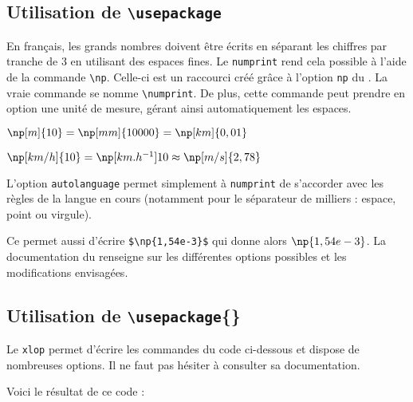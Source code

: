 \subsection{Utilisation de \texttt{\textbackslash usepackage}}

En français, les grands nombres doivent être écrits en séparant les chiffres par tranche de $3$ en utilisant des espaces fines. Le  \texttt{numprint} rend cela possible à l'aide de la commande \texttt{\textbackslash np}. Celle-ci est un raccourci créé grâce à l'option \texttt{np} du . La vraie commande se nomme \texttt{\textbackslash numprint}. De plus, cette commande peut prendre en option une unité de mesure, gérant ainsi automatiquement les espaces.\bigskip

{
\begin{SideBySideExample}
    $\np[m]{10} = \np[mm]{10000} = \np[km]{0,01}$
    
    $\np[km/h]{10} = \np[km.h^{-1}]{10}
    \approx \np[m/s]{2,78}$
\end{SideBySideExample}
}\bigskip

\begin{info}
    L'option \texttt{autolanguage} permet simplement à \texttt{numprint} de s'accorder avec les règles de la langue en cours (notamment pour le séparateur de milliers : espace, point ou virgule).
\end{info}

Ce  permet aussi d'écrire \verb!$\np{1,54e-3}$! qui donne alors $\np{1,54e-3}$. La documentation du  renseigne sur les différentes options possibles et les modifications envisagées.

\subsection{Utilisation de \texttt{\textbackslash usepackage}\{\}}

Le  \texttt{xlop} permet d'écrire les commandes du code ci-dessous et dispose de nombreuses options. Il ne faut pas hésiter à consulter sa documentation.


Voici le résultat de ce code :



